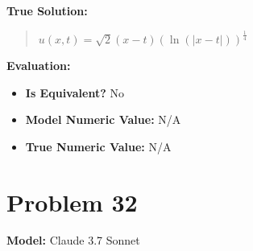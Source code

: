 \documentclass{article}
\begin{document}
\textbf{True Solution:}
\begin{quote}
$u(x,t) = \sqrt{2} (x-t) (\ln(|x-t|))^{\frac{1}{4}}$
\end{quote}

\textbf{Evaluation:}
\begin{itemize}
\item \textbf{Is Equivalent?} No
\item \textbf{Model Numeric Value:} N/A
\item \textbf{True Numeric Value:} N/A
\end{itemize}
\vspace{1cm}
\section*{Problem 32}
\textbf{Model:} Claude 3.7 Sonnet
\end{document}
